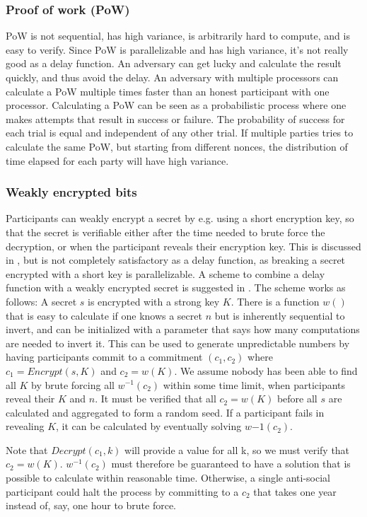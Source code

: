 \subsubsection{Proof of work (PoW)}
PoW is not sequential, has high variance, is arbitrarily hard to compute, and is easy to verify. Since PoW is parallelizable and has high variance, it's not really good as a delay function. An adversary can get lucky and calculate the result quickly, and thus avoid the delay. An adversary with multiple processors can calculate a PoW multiple times faster than an honest participant with one processor. Calculating a PoW can be seen as a probabilistic process where one makes attempts that result in success or failure. The probability of success for each trial is equal and independent of any other trial. If multiple parties tries to calculate the same PoW, but starting from different nonces, the distribution of time elapsed for each party will have high variance.  

\subsubsection{Weakly encrypted bits}
Participants can weakly encrypt a secret by e.g. using a short encryption key, so that the secret is verifiable either after the time needed to brute force the decryption, or when the participant reveals their encryption key.
This is discussed in \cite{syverson_weakly_1998}, but is not completely satisfactory as a delay function, as breaking a secret encrypted with a short key is parallelizable. 
A scheme to combine a delay function with a weakly encrypted secret is suggested in \cite{rivest_time-lock_1996}. The scheme works as follows: A secret $s$ is encrypted with a strong key $K$. There is a function $w()$ that is easy to calculate if one knows a secret $n$ but is inherently sequential to invert, and can be initialized with a parameter that says how many computations are needed to invert it.
This can be used to generate unpredictable numbers by having participants commit to a commitment $(c_1, c_2)$ where $c_1=Encrypt(s, K)$ and $c_2=w(K)$. We assume nobody has been able to find all $K$ by brute forcing all $w^{-1}(c_2)$ within some time limit, when participants reveal their $K$ and $n$. It must be verified that all $c_2=w(K)$ before all $s$ are calculated and aggregated to form a random seed. If a participant fails in revealing $K$, it can be calculated by eventually solving $w{-1}(c_2)$.

Note that $Decrypt(c_1, k)$ will provide a value for all k, so we must verify that $c_2=w(K)$. $w^{-1}(c_2)$ must therefore be guaranteed to have a solution that is possible to calculate within reasonable time. Otherwise, a single anti-social participant could halt the process by committing to a $c_2$ that takes one year instead of, say, one hour to brute force. 


